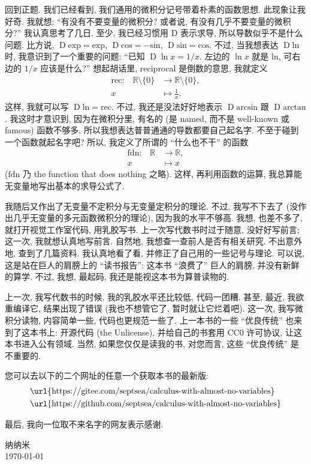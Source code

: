 回到正题. 我们已经看到, 我们通用的微积分记号带着朴素的函数思想. 此现象让我好奇. 我就想: ``有没有不要变量的微积分? 或者说, 有没有几乎不要变量的微积分?'' 我认真思考了几日. 至少, 我已经习惯用 $\mathrm{D}$ 表示求导, 所以导数似乎不是什么问题. 比方说, $\operatorname{D} \mathrm{exp} = \mathrm{exp}$, $\operatorname{D} \mathrm{cos} = -\mathrm{sin}$, $\operatorname{D} \mathrm{sin} = \mathrm{cos}$. 不过, 当我想表达 $\operatorname{D} \mathrm{ln}$ 时, 我意识到了一个重要的问题: ``已知 $\operatorname{D} \ln {x} = 1/x$. 左边的 $\ln {x}$ 就是 $\mathrm{ln}$, 可右边的 $1/x$ 应该是什么?'' 想起胡话里, reciprocal 是倒数的意思, 我就定义
\begin{align*}
    \text{$\mathrm{rec}$:} \quad
    \mathbb{R} \setminus \{ 0 \} & \to \mathbb{R} \setminus \{ 0 \}, \\
    x                            & \mapsto \frac{1}{x}.
\end{align*}
这样, 我就可以写 $\operatorname{D} \mathrm{ln} = \mathrm{rec}$. 不过, 我还是没法好好地表示 $\operatorname{D} \mathrm{arcsin}$ 跟 $\operatorname{D} \mathrm{arctan}$. 我这时才意识到, 因为在微积分里, 有名的 (是 named, 而不是 well-known 或 famous) 函数不够多, 所以我想表达普普通通的导数都要自己起名字. 不至于碰到一个函数就起名字吧? 所以, 我定义了所谓的 ``什么也不干'' 的函数
\begin{align*}
    \text{$\mathrm{fdn}$:} \quad
    \mathbb{R} & \to \mathbb{R}, \\
    x          & \mapsto x
\end{align*}
($\mathrm{fdn}$ 乃 the function that does nothing 之略). 这样, 再利用函数的运算, 我总算能无变量地写出基本的求导公式了.

我随后又作出了无变量不定积分与无变量定积分的理论. 不过, 我写不下去了 (没作出几乎无变量的多元函数微积分的理论), 因为我的水平不够高. 我想, 也差不多了, 就打开视觉工作室代码, 用乳胶写书. 上一次写代数书时过于随意, 没好好写前言; 这一次, 我就想认真地写前言. 自然地, 我想查一查前人是否有相关研究. 不出意外地, 查到了几篇资料. 我认真地看了看, 并修正了自己用的一些记号与理论. 可以说, 这是站在巨人的肩膀上的 ``读书报告'': 这本书 ``浪费了'' 巨人的肩膀, 并没有新鲜的算学. 不过, 我想, 最起码, 我还是能视这本书为算普读物的.

上一次, 我写代数书的时候, 我的乳胶水平还比较低, 代码一团糟. 甚至, 最近, 我欲重编译它, 结果出现了错误 (我也不想管它了, 暂时就让它烂着吧). 这一次, 我写微积分读物, 内容简单一些, 代码也更规范一些了. 上一本书的一些 ``优良传统'' 也来到了这本书上: 开源代码 (the Unlicense), 并给自己的书套用 CC0 许可协议, 让这本书进入公有领域. 当然, 如果您仅仅是读我的书, 对您而言, 这些 ``优良传统'' 是不重要的.

您可以去以下的二个网址的任意一个获取本书的最新版:
\begin{align*}
     & \text{\url{https://gitee.com/septsea/calculus-with-almost-no-variables}}  \\
     & \text{\url{https://github.com/septsea/calculus-with-almost-no-variables}}
\end{align*}

最后, 我向一位取不来名字的网友表示感谢.

\begin{flushright}
    纳纳米\\
    \today
\end{flushright}
